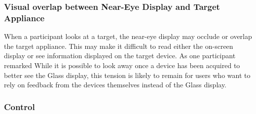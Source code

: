 \subsubsection{Visual overlap between Near-Eye Display and Target Appliance}
When a participant looks at a target, the near-eye display may occlude or overlap the target appliance. This may make it difficult to read either the on-screen display or see information displayed on the target device.  As one participant remarked  While it is possible to look away once a device has been acquired to better see the Glass display, this tension is likely to remain for users who want to rely on feedback from the devices themselves instead of the Glass display.

\subsubsection{Control}



